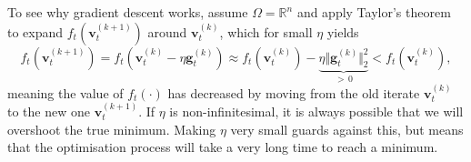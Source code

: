 \begin{mccorrection}
To see why gradient descent works, assume $\Omega = \mathbb{R}^n$ and apply Taylor's theorem to expand $f_t(\mathbf{v}_{t}^{(k+1)})$ around $\mathbf{v}_{t}^{(k)}$, which for small $\eta$ yields
\begin{equation}
	f_t(\mathbf{v}_{t}^{(k+1)})
	= f_t(\mathbf{v}_{t}^{(k)} - \eta\mathbf{g}_t^{(k)})
	\approx f_t(\mathbf{v}_{t}^{(k)}) - \underbrace{\eta\Vert\mathbf{g}_t^{(k)}\Vert_2^2}_{> \, 0}
	< f_t(\mathbf{v}_{t}^{(k)}),
\end{equation}
meaning the value of $f_t(\cdot)$ has decreased by moving from the old iterate $\mathbf{v}_{t}^{(k)}$ to the new one $\mathbf{v}_{t}^{(k+1)}$. If $\eta$ is non-infinitesimal, it is always possible that we will overshoot the true minimum. Making $\eta$ very small guards against this, but means that the optimisation process will take a very long time to reach a minimum.
\end{mccorrection}

